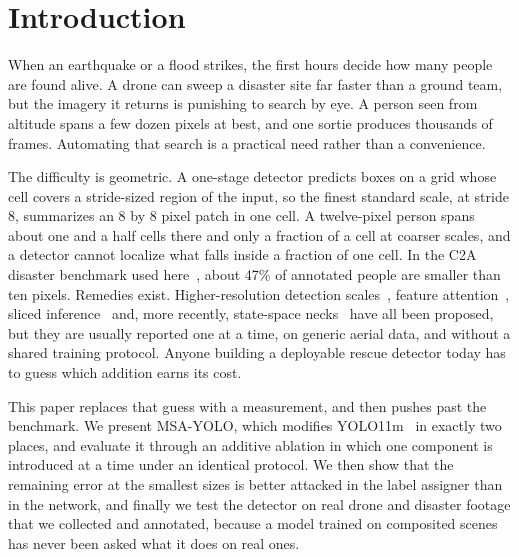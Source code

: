 \documentclass[conference,a4paper]{IEEEtran}
\begin{document}
\section{Introduction}
When an earthquake or a flood strikes, the first hours decide how many people
are found alive. A drone can sweep a disaster site far faster than a ground
team, but the imagery it returns is punishing to search by eye. A person seen
from altitude spans a few dozen pixels at best, and one sortie produces
thousands of frames. Automating that search is a practical need rather than a
convenience.

The difficulty is geometric. A one-stage detector predicts boxes on a grid whose
cell covers a stride-sized region of the input, so the finest standard scale, at
stride 8, summarizes an 8 by 8 pixel patch in one cell. A twelve-pixel person
spans about one and a half cells there and only a fraction of a cell at coarser
scales, and a detector cannot localize what falls inside a fraction of one cell.
In the C2A disaster benchmark used here~\cite{nihal2024c2a}, about 47\% of
annotated people are smaller than ten pixels. Remedies exist. Higher-resolution
detection scales~\cite{zhu2021tphyolov5}, feature
attention~\cite{woo2018cbam,wang2020eca}, sliced
inference~\cite{akyon2022sahi} and, more recently, state-space
necks~\cite{gu2023mamba,wang2025mambayolo} have all been proposed, but they are
usually reported one at a time, on generic aerial data, and without a shared
training protocol. Anyone building a deployable rescue detector today has to
guess which addition earns its cost.

This paper replaces that guess with a measurement, and then pushes past the
benchmark. We present MSA-YOLO, which modifies YOLO11m~\cite{jocher2024yolo11}
in exactly two places, and evaluate it through an additive ablation in which one
component is introduced at a time under an identical protocol. We then show that
the remaining error at the smallest sizes is better attacked in the label
assigner than in the network, and finally we test the detector on real drone and
disaster footage that we collected and annotated, because a model trained on
composited scenes has never been asked what it does on real ones.
\end{document}
